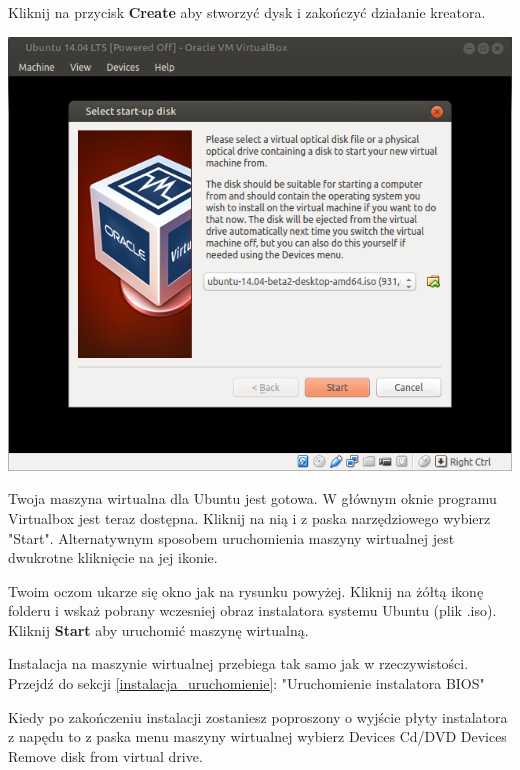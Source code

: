 \begin{flushright}
Kliknij na przycisk \textbf{Create} aby stworzyć dysk i zakończyć działanie kreatora.
\end{flushright}
\clearpage
\begin{center}
\includegraphics[scale=1]{images/virtualbox_start.png}
\end{center}
Twoja maszyna wirtualna dla Ubuntu jest gotowa. W głównym oknie programu Virtualbox jest teraz dostępna. Kliknij na nią i z paska narzędziowego wybierz "Start". Alternatywnym sposobem uruchomienia maszyny wirtualnej jest dwukrotne kliknięcie na jej ikonie.

Twoim oczom ukarze się okno jak na rysunku powyżej. Kliknij na żółtą ikonę folderu i wskaż pobrany wczesniej obraz instalatora systemu Ubuntu (plik .iso). Kliknij \textbf{Start} aby uruchomić maszynę wirtualną.

Instalacja na maszynie wirtualnej przebiega tak samo jak w rzeczywistości. Przejdź do sekcji \ref{instalacja_uruchomienie}: "Uruchomienie instalatora BIOS"

Kiedy po zakończeniu instalacji zostaniesz poproszony o wyjście płyty instalatora z napędu to z paska menu maszyny wirtualnej wybierz Devices Cd/DVD Devices Remove disk from virtual drive.
\clearpage